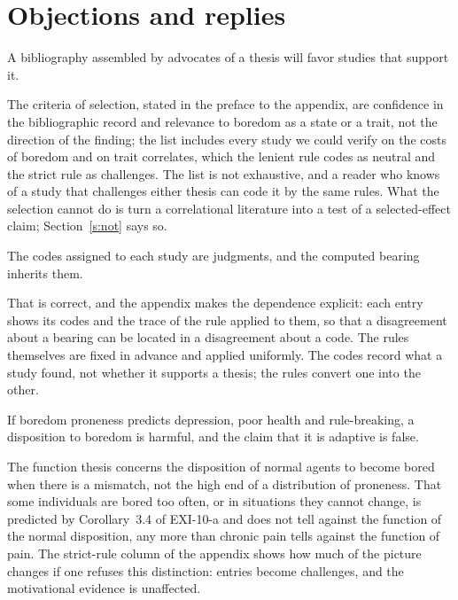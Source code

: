\documentclass{situationist-preprint}
\begin{document}
\section{Objections and replies}\label{s:obj}

\begin{objection}[Selection]
A bibliography assembled by advocates of a thesis will favor studies that support it.
\end{objection}

\begin{reply}
The criteria of selection, stated in the preface to the appendix, are confidence in the bibliographic record and relevance to boredom as a state or a trait, not the direction of the finding; the list includes every study we could verify on the costs of boredom and on trait correlates, which the lenient rule codes as neutral and the strict rule as challenges. The list is not exhaustive, and a reader who knows of a study that challenges either thesis can code it by the same rules. What the selection cannot do is turn a correlational literature into a test of a selected-effect claim; Section~\ref{s:not} says so.
\end{reply}

\begin{objection}
The codes assigned to each study are judgments, and the computed bearing inherits them.
\end{objection}

\begin{reply}
That is correct, and the appendix makes the dependence explicit: each entry shows its codes and the trace of the rule applied to them, so that a disagreement about a bearing can be located in a disagreement about a code. The rules themselves are fixed in advance and applied uniformly. The codes record what a study found, not whether it supports a thesis; the rules convert one into the other.
\end{reply}

\begin{objection}
If boredom proneness predicts depression, poor health and rule-breaking, a disposition to boredom is harmful, and the claim that it is adaptive is false.
\end{objection}

\begin{reply}
The function thesis concerns the disposition of normal agents to become bored when there is a mismatch, not the high end of a distribution of proneness. That some individuals are bored too often, or in situations they cannot change, is predicted by Corollary~3.4 of EXI-10-a and does not tell against the function of the normal disposition, any more than chronic pain tells against the function of pain. The strict-rule column of the appendix shows how much of the picture changes if one refuses this distinction: \stbsC{} entries become challenges, and the motivational evidence is unaffected.
\end{reply}
\end{document}
